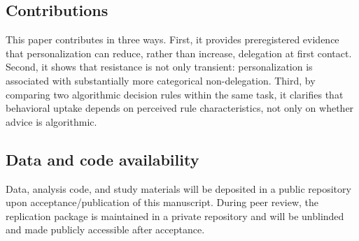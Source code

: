 \documentclass[a4paper, 12pt, fleqn]{article}
\theoremstyle{definition}
\begin{document}
\subsection{Contributions}
This paper contributes in three ways. First, it provides preregistered evidence that personalization can reduce, rather than increase, delegation at first contact. Second, it shows that resistance is not only transient: personalization is associated with substantially more categorical non-delegation. Third, by comparing two algorithmic decision rules within the same task, it clarifies that behavioral uptake depends on perceived rule characteristics, not only on whether advice is algorithmic.

\subsection{Data and code availability}
Data, analysis code, and study materials will be deposited in a public repository upon acceptance/publication of this manuscript. During peer review, the replication package is maintained in a private repository and will be unblinded and made publicly accessible after acceptance.


\newpage
\thispagestyle{plain}
\addtolength{\topmargin}{-.5cm}
\addtolength{\textheight}{.8cm}




 
\end{document}
